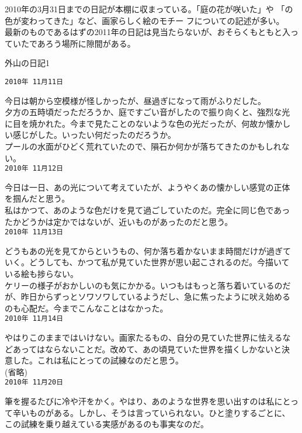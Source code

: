 \documentclass[a4paper,8pt,min]{jsarticle}
\begin{document}
\begin{topic}
 \item[外山の日記1] 
 2010年の3月31日までの日記が本棚に収まっている。「庭の花が咲いた」や
 「の色が変わってきた」など、画家らしく絵のモチー
 フについての記述が多い。\\
 最新のものであるはずの2011年の日記は見当たらないが、おそらくもともと入っ
 ていたであろう場所に隙間がある。
\end{topic}
\begin{itembox}{外山の日記1}
 
 \tt{2010年 11月11日}
 
 今日は朝から空模様が怪しかったが、昼過ぎになって雨がふりだした。\\
 夕方の五時頃だっただろうか、庭ですごい音がしたので振り向くと、強烈な光
 に目を焼かれた。今まで見たことのないような色の光だったが、何故か懐かし
 い感じがした。いったい何だったのだろうか。\\
 プールの水面がひどく荒れていたので、隕石か何かが落ちてきたのかもしれな
 い。\\

 \tt{2010年 11月12日}

 今日は一日、あの光について考えていたが、ようやくあの懐かしい感覚の正体
 を掴んだと思う。\\
 私はかつて、あのような色だけを見て過ごしていたのだ。完全に同じ色であっ
 たかどうかは定かではないが、近いものがあったのだと思う。\\

 \tt{2010年 11月13日}

 どうもあの光を見てからというもの、何か落ち着かないまま時間だけが過ぎて
 いく。どうしても、かつて私が見ていた世界が思い起こされるのだ。今描いて
 いる絵も捗らない。\\
 ケリーの様子がおかしいのも気にかかる。いつもはもっと落ち着いているのだ
 が、昨日からずっとソワソワしているようだし、急に焦ったように吠え始める
 のも心配だ。今までこんなことはなかった。\\

 \tt{2010年 11月14日}

 やはりこのままではいけない。画家たるもの、自分の見ていた世界に怯えるな
 どあってはならないことだ。改めて、あの頃見ていた世界を描くしかないと決
 意した。これは私にとっての試練なのだと思う。\\

 (省略)\\

 \tt{2010年 11月20日}

 筆を握るたびに冷や汗をかく。やはり、あのような世界を思い出すのは私にとっ
 て辛いものがある。しかし、そうは言っていられない。ひと塗りするごとに、
 この試練を乗り越えている実感があるのも事実なのだ。\\


\end{itembox}
\end{document}
